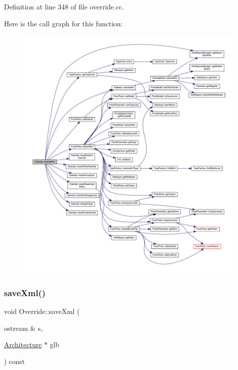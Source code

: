 Definition at line 348 of file override.\+cc.

Here is the call graph for this function\+:
\nopagebreak
\begin{figure}[H]
\begin{center}
\leavevmode
\includegraphics[width=350pt]{class_override_a81f34dfc11c427ea0873358bef93ada3_cgraph}
\end{center}
\end{figure}
\mbox{\label{class_override_ab983057b1943546a6ed8ef1b2bbd3627}} 
\subsubsection{\texorpdfstring{saveXml()}{saveXml()}}
{\footnotesize\ttfamily void Override\+::save\+Xml (\begin{DoxyParamCaption}\item[{ostream \&}]{s,  }\item[{\mbox{\hyperlink{class_architecture}{Architecture}} $\ast$}]{glb }\end{DoxyParamCaption}) const}



